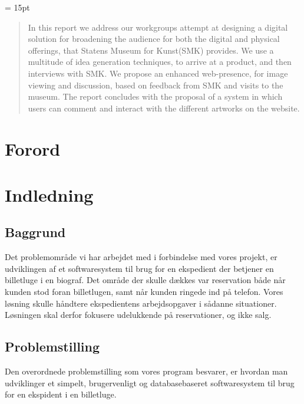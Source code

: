 \documentclass[final]{rapport1}
\begin{document}
\begin{titlepage}

\end{titlepage}






 
\baselineskip= 15pt

\begin{abstract}

In this report we address our workgroups attempt at designing a digital solution for broadening the audience for both the digital and physical offerings, that Statens Museum for Kunst(SMK) provides. We use a multitude of idea generation techniques, to arrive at a product, and then interviews with SMK. We propose an enhanced web-presence, for image viewing and discussion, based on feedback from SMK and visits to the museum. The report concludes with the proposal of a system in which users can comment and interact with the different artworks on the website.

\end{abstract}
\clearpage
\tableofcontents
\chapter{Forord}


\chapter{Indledning}
\section{Baggrund}
Det problemområde vi har arbejdet med i forbindelse med vores projekt, er udviklingen af et softwaresystem til brug for en ekspedient der betjener en billetluge i en biograf. Det område der skulle dækkes var reservation både når kunden stod foran billetlugen, samt når kunden ringede ind på telefon. Vores løsning skulle håndtere   ekspedientens arbejdsopgaver i sådanne situationer. Løsningen skal derfor fokusere udelukkende på reservationer, og ikke salg. 

\section{Problemstilling}
Den overordnede problemstilling som vores program besvarer, er hvordan man udviklinger et simpelt, brugervenligt og databasebaseret softwaresystem til brug for en ekspident i en billetluge. 
\end{document}
